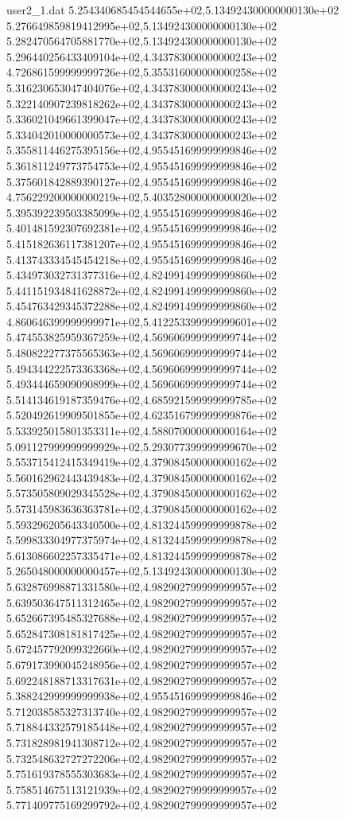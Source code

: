 \begin{filecontents}{user2_1.dat}
5.254340685454544655e+02,5.134924300000000130e+02
5.276649859819412995e+02,5.134924300000000130e+02
5.282470564705881770e+02,5.134924300000000130e+02
5.296440256433409104e+02,4.343783000000000243e+02
4.726861599999999726e+02,5.355316000000000258e+02
5.316230653047404076e+02,4.343783000000000243e+02
5.322140907239818262e+02,4.343783000000000243e+02
5.336021049661399047e+02,4.343783000000000243e+02
5.334042010000000573e+02,4.343783000000000243e+02
5.355811446275395156e+02,4.955451699999999846e+02
5.361811249773754753e+02,4.955451699999999846e+02
5.375601842889390127e+02,4.955451699999999846e+02
4.756229200000000219e+02,5.403528000000000020e+02
5.395392239503385099e+02,4.955451699999999846e+02
5.401481592307692381e+02,4.955451699999999846e+02
5.415182636117381207e+02,4.955451699999999846e+02
5.413743334545454218e+02,4.955451699999999846e+02
5.434973032731377316e+02,4.824991499999999860e+02
5.441151934841628872e+02,4.824991499999999860e+02
5.454763429345372288e+02,4.824991499999999860e+02
4.860646399999999971e+02,5.412253399999999601e+02
5.474553825959367259e+02,4.569606999999999744e+02
5.480822277375565363e+02,4.569606999999999744e+02
5.494344222573363368e+02,4.569606999999999744e+02
5.493444659090908999e+02,4.569606999999999744e+02
5.514134619187359476e+02,4.685921599999999785e+02
5.520492619909501855e+02,4.623516799999999876e+02
5.533925015801353311e+02,4.588070000000000164e+02
5.091127999999999929e+02,5.293077399999999670e+02
5.553715412415349419e+02,4.379084500000000162e+02
5.560162962443439483e+02,4.379084500000000162e+02
5.573505809029345528e+02,4.379084500000000162e+02
5.573145983636363781e+02,4.379084500000000162e+02
5.593296205643340500e+02,4.813244599999999878e+02
5.599833304977375974e+02,4.813244599999999878e+02
5.613086602257335471e+02,4.813244599999999878e+02
5.265048000000000457e+02,5.134924300000000130e+02
5.632876998871331580e+02,4.982902799999999957e+02
5.639503647511312465e+02,4.982902799999999957e+02
5.652667395485327688e+02,4.982902799999999957e+02
5.652847308181817425e+02,4.982902799999999957e+02
5.672457792099322660e+02,4.982902799999999957e+02
5.679173990045248956e+02,4.982902799999999957e+02
5.692248188713317631e+02,4.982902799999999957e+02
5.388242999999999938e+02,4.955451699999999846e+02
5.712038585327313740e+02,4.982902799999999957e+02
5.718844332579185448e+02,4.982902799999999957e+02
5.731828981941308712e+02,4.982902799999999957e+02
5.732548632727272206e+02,4.982902799999999957e+02
5.751619378555303683e+02,4.982902799999999957e+02
5.758514675113121939e+02,4.982902799999999957e+02
5.771409775169299792e+02,4.982902799999999957e+02

\end{filecontents}
